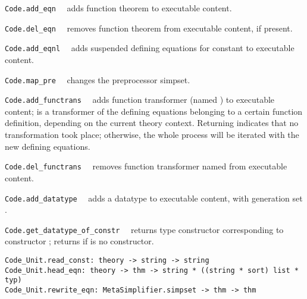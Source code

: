\begin{isabellebody}
\begin{isamarkuptext}
  \begin{description}

  \item \verb|Code.add_eqn|~~ adds function
     theorem  to executable content.

  \item \verb|Code.del_eqn|~~ removes function
     theorem  from executable content, if present.

  \item \verb|Code.add_eqnl|~~ adds
     suspended defining equations  for constant
      to executable content.

  \item \verb|Code.map_pre|~~ changes
     the preprocessor simpset.

  \item \verb|Code.add_functrans|~~ adds
     function transformer  (named ) to executable content;
      is a transformer of the defining equations belonging
     to a certain function definition, depending on the
     current theory context.  Returning  indicates that no
     transformation took place;  otherwise, the whole process will be iterated
     with the new defining equations.

  \item \verb|Code.del_functrans|~~ removes
     function transformer named  from executable content.

  \item \verb|Code.add_datatype|~~ adds
     a datatype to executable content, with generation
     set .

  \item \verb|Code.get_datatype_of_constr|~~
     returns type constructor corresponding to
     constructor ; returns 
     if  is no constructor.

  \end{description}%
\end{isamarkuptext}%
\isamarkuptrue%
%
\endisatagmlref
{\isafoldmlref}%
%
\isadelimmlref
%
\endisadelimmlref
%
\isamarkuptrue%
%
\isadelimmlref
%
\endisadelimmlref
%
\isatagmlref
%
\begin{isamarkuptext}%
\begin{mldecls}
  \verb|Code_Unit.read_const: theory -> string -> string| \\
  \verb|Code_Unit.head_eqn: theory -> thm -> string * ((string * sort) list * typ)| \\
  \verb|Code_Unit.rewrite_eqn: MetaSimplifier.simpset -> thm -> thm| \\
  \end{mldecls}


\end{isamarkuptext}
\end{isabellebody}
